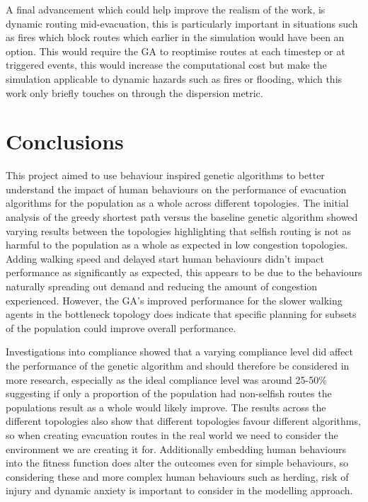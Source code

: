 \documentclass[12pt,a4paper]{report}
\begin{document}
A final advancement which could help improve the realism of the work, is dynamic routing mid-evacuation, this is particularly important in situations such as fires which block routes which earlier in the simulation would have been an option. This would require the GA to reoptimise routes at each timestep or at triggered events, this would increase the computational cost but make the simulation applicable to dynamic hazards such as fires or flooding, which this work only briefly touches on through the dispersion metric.


\chapter{Conclusions}
This project aimed to use behaviour inspired genetic algorithms to better understand the impact of human behaviours on the performance of evacuation algorithms for the population as a whole across different topologies. The initial analysis of the greedy shortest path versus the baseline genetic algorithm showed varying results between the topologies highlighting that selfish routing is not as harmful to the population as a whole as expected in low congestion topologies. Adding walking speed and delayed start human behaviours didn’t impact performance as significantly as expected, this appears to be due to the behaviours naturally spreading out demand and reducing the amount of congestion experienced. However, the GA’s improved performance for the slower walking agents in the bottleneck topology does indicate that specific planning for subsets of the population could improve overall performance. 

Investigations into compliance showed that a varying compliance level did affect the performance of the genetic algorithm and should therefore be considered in more research, especially as the ideal compliance level was around 25-50\% suggesting if only a proportion of the population had non-selfish routes the populations result as a whole would likely improve. The results across the different topologies also show that different topologies favour different algorithms, so when creating evacuation routes in the real world we need to consider the environment we are creating it for. Additionally embedding human behaviours into the fitness function does alter the outcomes even for simple behaviours, so considering these and more complex human behaviours such as herding, risk of injury and dynamic anxiety is important to consider in the modelling approach.
\end{document}
